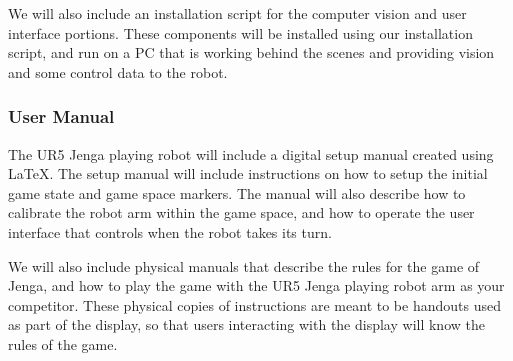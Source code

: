 We will also include an installation script for the computer vision and user interface portions. These components will be installed using our installation script, and run on a PC that is working behind the scenes and providing vision and some control data to the robot.

\subsubsection{User Manual}
The UR5 Jenga playing robot will include a digital setup manual created using LaTeX. The setup manual will include instructions on how to setup the initial game state and game space markers. The manual will also describe how to calibrate the robot arm within the game space, and how to operate the user interface that controls when the robot takes its turn.

We will also include physical manuals that describe the rules for the game of Jenga, and how to play the game with the UR5 Jenga playing robot arm as your competitor. These physical copies of instructions are meant to be handouts used as part of the display, so that users interacting with the display will know the rules of the game.
